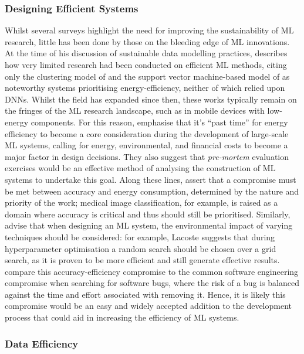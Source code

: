 \documentclass[a4paper, 12pt]{article}
\begin{document}
    \subsubsection{Designing Efficient Systems}

    Whilst several surveys highlight the need for improving the sustainability of ML research, little has been done by those on the bleeding edge of ML innovations. At the time of his discussion of sustainable data modelling practices, \citet{aljarrah-2015} describes how very limited research had been conducted on efficient ML methods, citing only the clustering model of \citet{yoo-2011} and the support vector machine-based model of \citet{cheng-2010} as noteworthy systems prioritising energy-efficiency, neither of which relied upon DNNs. Whilst the field has expanded since then, these works typically remain on the fringes of the ML research landscape, such as in mobile devices with low-energy components. For this reason, \citet{bender-2021} emphasise that it's ``past time” for energy efficiency to become a core consideration during the development of large-scale ML systems, calling for energy, environmental, and financial costs to become a major factor in design decisions. They also suggest that \emph{pre-mortem} evaluation exercises \citep{klein-2008} would be an effective method of analysing the construction of ML systems to undertake this goal. Along these lines, \citet{sharma-kaulgud-2021} assert that a compromise must be met between accuracy and energy consumption, determined by the nature and priority of the work; medical image classification, for example, is raised as a domain where accuracy is critical and thus should still be prioritised. Similarly, \citet{lacoste-2019} advise that when designing an ML system, the environmental impact of varying techniques should be considered: for example, Lacoste suggests that during hyperparameter optimisation a random search should be chosen over a grid search, as it is proven to be more efficient and still generate effective results. \citet{sharma-kaulgud-2021} compare this accuracy-efficiency compromise to the common software engineering compromise when searching for software bugs, where the risk of a bug is balanced against the time and effort associated with removing it. Hence, it is likely this compromise would be an easy and widely accepted addition to the development process that could aid in increasing the efficiency of ML systems. 

    \subsubsection{Data Efficiency}
\end{document}
